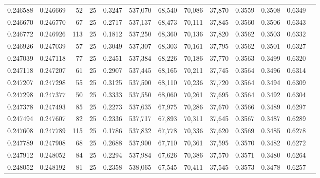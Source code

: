\begin{tabular}{rrrrrrrrrrrrr}
0.246588 & 0.246669 &    52 &  25 &                                     0.3247 & 537,070 &  68,540 &  70,086 &  37,870 & 0.3559 & 0.3508 & 0.6349 \\
0.246670 & 0.246770 &    67 &  25 &                                     0.2717 & 537,137 &  68,473 &  70,111 &  37,845 & 0.3560 & 0.3506 & 0.6343 \\
0.246772 & 0.246926 &   113 &  25 &                                     0.1812 & 537,250 &  68,360 &  70,136 &  37,820 & 0.3562 & 0.3503 & 0.6332 \\
0.246926 & 0.247039 &    57 &  25 &                                     0.3049 & 537,307 &  68,303 &  70,161 &  37,795 & 0.3562 & 0.3501 & 0.6327 \\
0.247039 & 0.247118 &    77 &  25 &                                     0.2451 & 537,384 &  68,226 &  70,186 &  37,770 & 0.3563 & 0.3499 & 0.6320 \\
0.247118 & 0.247207 &    61 &  25 &                                     0.2907 & 537,445 &  68,165 &  70,211 &  37,745 & 0.3564 & 0.3496 & 0.6314 \\
0.247207 & 0.247298 &    55 &  25 &                                     0.3125 & 537,500 &  68,110 &  70,236 &  37,720 & 0.3564 & 0.3494 & 0.6309 \\
0.247298 & 0.247377 &    50 &  25 &                                     0.3333 & 537,550 &  68,060 &  70,261 &  37,695 & 0.3564 & 0.3492 & 0.6304 \\
0.247378 & 0.247493 &    85 &  25 &                                     0.2273 & 537,635 &  67,975 &  70,286 &  37,670 & 0.3566 & 0.3489 & 0.6297 \\
0.247494 & 0.247607 &    82 &  25 &                                     0.2336 & 537,717 &  67,893 &  70,311 &  37,645 & 0.3567 & 0.3487 & 0.6289 \\
0.247608 & 0.247789 &   115 &  25 &                                     0.1786 & 537,832 &  67,778 &  70,336 &  37,620 & 0.3569 & 0.3485 & 0.6278 \\
0.247789 & 0.247908 &    68 &  25 &                                     0.2688 & 537,900 &  67,710 &  70,361 &  37,595 & 0.3570 & 0.3482 & 0.6272 \\
0.247912 & 0.248052 &    84 &  25 &                                     0.2294 & 537,984 &  67,626 &  70,386 &  37,570 & 0.3571 & 0.3480 & 0.6264 \\
0.248052 & 0.248192 &    81 &  25 &                                     0.2358 & 538,065 &  67,545 &  70,411 &  37,545 & 0.3573 & 0.3478 & 0.6257 \\

\end{tabular}
